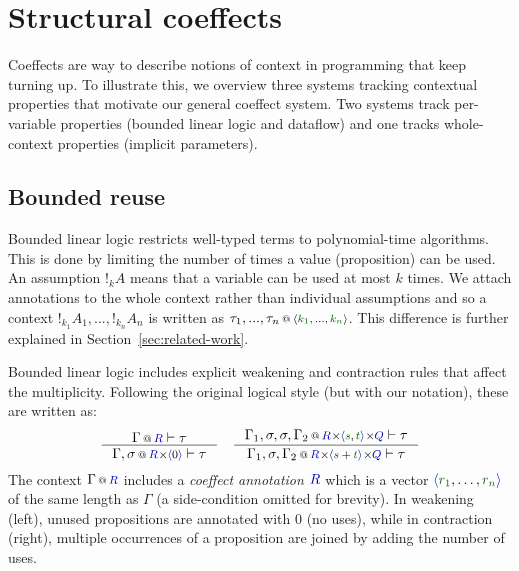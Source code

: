
\section{Structural coeffects}
\label{sec:intro-coeffects}

Coeffects are way to describe notions of context in programming that keep turning up. 
To illustrate this, we overview three systems tracking contextual properties that 
 motivate our general coeffect system. Two systems track per-variable properties (bounded 
linear logic and dataflow) and one tracks whole-context properties (implicit parameters).

\subsection{Bounded reuse}
\label{sec:intro-coeffects-bll}

Bounded linear logic \cite{girard1992bounded} restricts well-typed terms to polynomial-time algorithms.  
This is done by limiting the number of times a value (proposition) can be used. An assumption
$!_k A$ means that a variable can be used at most $k$ times. 
We attach annotations to the whole context rather than individual assumptions and so a context
$!_{k_1} A_1, ..., !_{k_n} A_n$ is written as $\coctx{\tau_1, ..., \tau_n}{\langle \cclrd{k_1}, ..., \cclrd{k_n}\rangle}$. 
This difference is further explained in Section~\ref{sec:related-work}. %

Bounded linear logic includes explicit weakening and contraction rules
that affect the multiplicity. Following the original logical style (but with our notation), these are written as:
\[
\inference
  {\coctx{\Gamma}{\aclrd{R}} \vdash \tau}
  {\coctx{\Gamma,\sigma}{\aclrd{R} \cons \alift{0}} \vdash \tau} 
\quad
\inference
  {\coctx{\Gamma_1,\sigma,\sigma,\Gamma_2}{\aclrd{R}\cons \alift{\cclrd{s},\cclrd{t}} \cons \aclrd{Q}} \vdash \tau}
  {\coctx{\Gamma_1,\sigma,\Gamma_2}{\aclrd{R}\cons\alift{\cclrd{s}+\cclrd{t}} \cons \aclrd{Q}} \vdash \tau}
\]
The context $\coctx{\Gamma}{\aclrd{R}}$ includes a \emph{coeffect annotation} $\aclrd{R}$ which is a vector
$\alift{\cclrd{r_1}, \ldots, \cclrd{r_n}}$ of the same length as $\Gamma$ (a side-condition omitted for brevity).
In weakening (left), unused propositions are annotated with $0$ (no uses), while in contraction (right), multiple 
occurrences of a proposition are joined by adding the number of uses.


